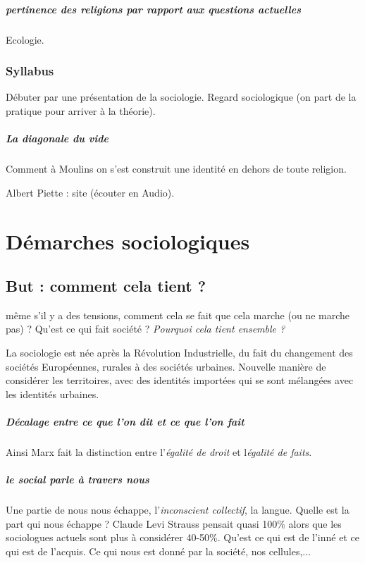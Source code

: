 \paragraph{pertinence des religions par rapport aux questions actuelles} Ecologie.


\subsection{Syllabus}

Débuter par une présentation de la sociologie. Regard sociologique (on part de la pratique pour arriver à la théorie).
\paragraph{La diagonale du vide} Comment à Moulins on s'est construit une identité en dehors de toute religion.



Albert Piette : site (écouter en Audio). 



\chapter{Démarches sociologiques}

\section{But : comment cela tient ?}

même s'il y a des tensions, comment cela se fait que cela marche (ou ne marche pas) ? Qu'est ce qui fait société ? \textit{Pourquoi cela tient ensemble ?}

La sociologie est née après la Révolution Industrielle, du fait du changement des sociétés Européennes, rurales à des sociétés urbaines. Nouvelle manière de considérer les territoires, avec des identités importées qui se sont mélangées avec les identités urbaines. 

\paragraph{Décalage entre ce que l'on dit et ce que l'on fait} Ainsi Marx fait la distinction entre l'\textit{égalité de droit} et l\textit{égalité de faits}.  

\paragraph{le social parle à travers nous} Une partie de nous nous échappe, l'\textit{inconscient collectif}, la langue. Quelle est la part qui nous échappe ? Claude Levi Strauss pensait quasi 100\% alors que les sociologues actuels sont plus à considérer 40-50\%. Qu'est ce qui est de l'inné et ce qui est de l'acquis. Ce qui nous est donné par la société,  nos cellules,...

